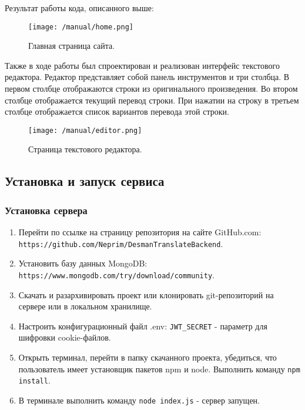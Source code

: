 \documentclass[a4paper,12pt]{article}
\begin{document}
Результат работы кода, описанного выше:

\begin{figure}[H]
\centering
\texttt{[image: /manual/home.png]}
\caption{Главная страница сайта.}
\label{fig:pagehome}
\end{figure}

Также в ходе работы был спроектирован и реализован интерфейс текстового редактора. Редактор представляет собой панель инструментов и три столбца. В первом столбце отображаются строки из оригинального произведения. Во втором столбце отображается текущий перевод строки. При нажатии на строку в третьем столбце отображается список вариантов перевода этой строки.
\begin{figure}[H]
\centering
\texttt{[image: /manual/editor.png]}
\caption{Страница текстового редактора.}
\label{fig:pageeditor}
\end{figure}

\subsection{Установка и запуск сервиса}

\subsubsection{Установка сервера}
\begin{enumerate}
\item Перейти по ссылке на страницу репозитория на сайте GitHub.com:\\ \verb|https://github.com/Neprim/DesmanTranslateBackend|.
\item Установить базу данных MongoDB:\\ \verb|https://www.mongodb.com/try/download/community|.
\item Скачать и разархивировать проект или клонировать git-репозиторий на сервере или в локальном хранилище.
\item Настроить конфигурационный файл .env: \verb|JWT_SECRET| - параметр для шифровки cookie-файлов.
\item Открыть терминал, перейти в папку скачанного проекта, убедиться, что пользователь имеет установщик пакетов npm и node. Выполнить команду \verb|npm install|.
\item В терминале выполнить команду \verb|node index.js| - сервер запущен.
\end{enumerate}
\end{document}
